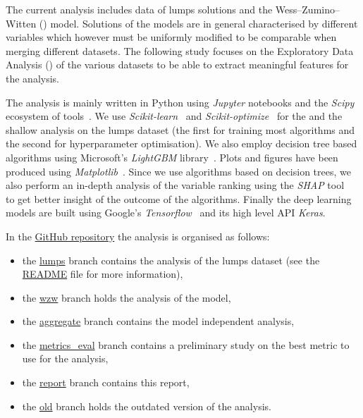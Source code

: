 The current analysis includes data of lumps solutions and the Wess--Zumino--Witten (\wzw)  model.
Solutions of the models are in general characterised by different variables which however must be uniformly modified to be comparable when merging different datasets.
The following study focuses on the Exploratory Data Analysis (\eda) of the various datasets to be able to extract meaningful features for the \ml analysis.

The analysis is mainly written in Python using \emph{Jupyter} notebooks and the \emph{Scipy} ecosystem of tools~\Cite{Virtanen:2020:SciPyFundamentalAlgorithms}.
We use \emph{Scikit-learn}~\Cite{Pedregosa:2011:ScikitlearnMachineLearning} and \emph{Scikit-optimize}~\Cite{Head:2018:ScikitoptimizeScikitoptimizeV0} for the \eda and the shallow \ml analysis on the lumps dataset (the first for training most algorithms and the second for hyperparameter optimisation).
We also employ decision tree based algorithms using Microsoft's \emph{LightGBM} library~\Cite{Ke:2017:LightGBMHighlyEfficient}.
Plots and figures have been produced using \emph{Matplotlib}~\Cite{Hunter:2007:Matplotlib2DGraphics}.
Since we use algorithms based on decision trees, we also perform an in-depth analysis of the variable ranking using the \emph{SHAP} tool~\Cite{Lundberg:2020:LocalExplanationsGlobal} to get better insight of the outcome of the algorithms.
Finally the deep learning models are built using Google's \emph{Tensorflow}~\Cite{Abadi:2015:TensorFlowLargescaleMachine} and its high level API \emph{Keras}.

In the \href{https://github.com/thesfinox/ml-sft-trunc}{GitHub repository} the analysis is organised as follows:
\begin{itemize}
  \item the \href{https://github.com/thesfinox/ml-sft-trunc}{lumps} branch contains the analysis of the lumps dataset (see the \href{https://github.com/thesfinox/ml-sft-trunc/blob/lumps/README.md}{README} file for more information),

  \item the \href{https://github.com/thesfinox/ml-sft-trunc/tree/wzw}{wzw} branch holds the analysis of the \wzw model,

  \item the \href{https://github.com/thesfinox/ml-sft-trunc/tree/aggregate}{aggregate} branch contains the model independent analysis,

  \item the \href{https://github.com/thesfinox/ml-sft-trunc/tree/metrics_eval}{metrics\_eval} branch contains a preliminary study on the best metric to use for the analysis,

  \item the \href{https://github.com/thesfinox/ml-sft-trunc/tree/report}{report} branch contains this report,

  \item the \href{https://github.com/thesfinox/ml-sft-trunc/tree/old}{old} branch holds the outdated version of the analysis.
\end{itemize}

